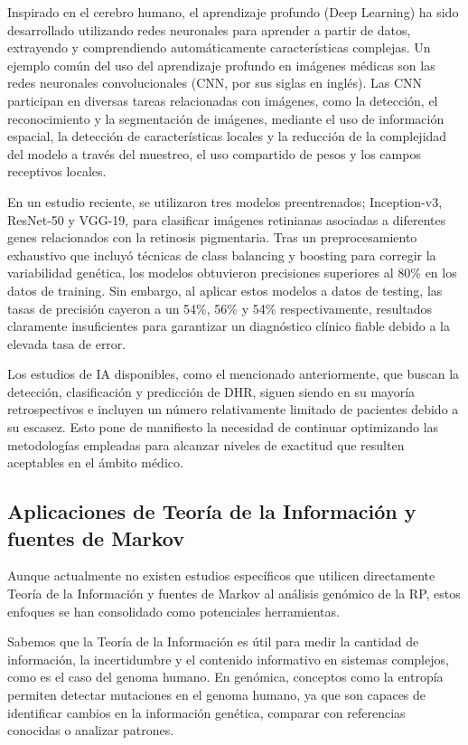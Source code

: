 \documentclass[11pt,spanish,listoffigures,listoftables]{tfgetsinf}
\begin{document}
Inspirado en el cerebro humano, el aprendizaje profundo (Deep Learning) ha sido desarrollado utilizando redes neuronales para aprender a partir de datos, extrayendo y comprendiendo automáticamente características complejas. Un ejemplo común del uso del aprendizaje profundo en imágenes médicas son las redes neuronales convolucionales (\ac{CNN}, por sus siglas en inglés). Las \ac{CNN} participan en diversas tareas relacionadas con imágenes, como la detección, el reconocimiento y la segmentación de imágenes, mediante el uso de información espacial, la detección de características locales y la reducción de la complejidad del modelo a través del muestreo, el uso compartido de pesos y los campos receptivos locales\cite{SHE}.

En un estudio reciente, se utilizaron tres modelos preentrenados; Inception-v3, ResNet-50 y VGG-19, para clasificar imágenes retinianas asociadas a diferentes genes relacionados con la retinosis pigmentaria. Tras un preprocesamiento exhaustivo que incluyó técnicas de class balancing y boosting para corregir la variabilidad genética, los modelos obtuvieron precisiones superiores al 80\% en los datos de training\cite{FER}. Sin embargo, al aplicar estos modelos a datos de testing, las tasas de precisión cayeron a un 54\%, 56\% y 54\% respectivamente, resultados claramente insuficientes para garantizar un diagnóstico clínico fiable debido a la elevada tasa de error.

Los estudios de \ac{IA} disponibles, como el mencionado anteriormente, que buscan la detección, clasificación y predicción de \ac{DHR}, siguen siendo en su mayoría retrospectivos e incluyen un número relativamente limitado de pacientes debido a su escasez\cite{ISS}. Esto pone de manifiesto la necesidad de continuar optimizando las metodologías empleadas para alcanzar niveles de exactitud que resulten aceptables en el ámbito médico.

\subsection{Aplicaciones de Teoría de la Información y fuentes de Markov}

Aunque actualmente no existen estudios específicos que utilicen directamente Teoría de la Información y fuentes de Markov al análisis genómico de la \ac{RP}, estos enfoques se han consolidado como potenciales herramientas.

Sabemos que la Teoría de la Información es útil para medir la cantidad de información, la incertidumbre y el contenido informativo en sistemas complejos, como es el caso del genoma humano. En genómica, conceptos como la entropía permiten detectar mutaciones en el genoma humano, ya que son capaces de identificar cambios en la información genética, comparar con referencias conocidas o analizar patrones\cite{SEC}.
\end{document}
